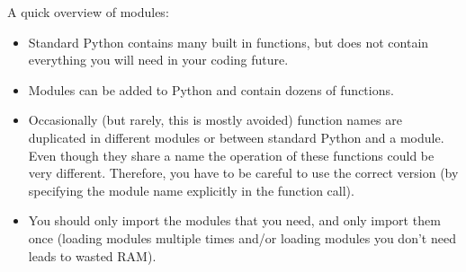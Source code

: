 


\noindent A quick overview of modules: 
\begin{itemize}
\item Standard Python contains many built in functions, but does not contain everything you will need in your coding future.
\item Modules can be added to Python and contain dozens of functions.
\item Occasionally (but rarely, this is mostly avoided) function names are duplicated in different modules or between standard Python and a module. Even though they share a name the operation of these functions could be very different. Therefore, you have to be careful to use the correct version (by specifying the module name explicitly in the function call).
\item You should only import the modules that you need, and only import them once (loading modules multiple times and/or loading modules you don't need leads to wasted RAM).
\end{itemize}

